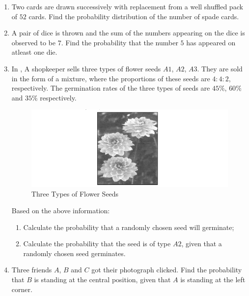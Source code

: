 \begin{enumerate}[label=\thesection.\arabic*.,ref=\thesection.\theenumi]
\item Two cards are drawn successively with replacement from a well shuffled pack of $52$ cards. Find the probability distribution of the number of spade cards.

\item A pair of dice is thrown and the sum of the numbers appearing on the dice is observed to be $7$. Find the probability that the number $5$ has appeared on atleast one die.

\item In , A shopkeeper sells three types of flower seeds $A1$, $A2$, $A3$. They are sold in the form of a mixture, where the proportions of these seeds are $4:4:2$, respectively. The germination rates of the three types of seeds are $45\%$, $60\%$ and $35\%$ respectively.

\begin{figure}[H]
        \centering
        \includegraphics[width=\columnwidth]{./figs/Screenshot (23).png}
        \caption{Three Types of Flower Seeds}
        \label{fig:2022/probability/fig2.png}
    \end{figure}

    Based on the above information:
    
    \begin{enumerate}[label=(\alph*)]
    
 \item Calculate the probability that a randomly chosen seed will germinate;
 
 \item Calculate the probability that the seed is of type $A2$, given that a randomly chosen seed germinates.

\end{enumerate}

\item Three friends $A$, $B$ and $C$ got their photograph clicked. Find the 
probability that $B$ is standing at the central position, given that $A$ is 
standing at the left corner. 


\end{enumerate}

